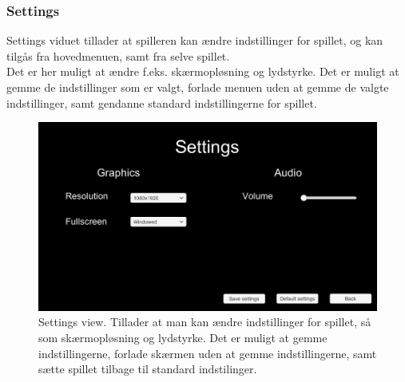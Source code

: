 \subsubsection{Settings}
Settings viduet tillader at spilleren kan ændre indstillinger for spillet, og kan tilgås fra hovedmenuen, samt fra selve spillet.\\
Det er her muligt at ændre f.eks. skærmopløsning og lydstyrke. Det er muligt at gemme de indstillinger som er valgt, forlade menuen uden at gemme de valgte indstillinger, samt gendanne standard indstillingerne for spillet. 

\begin{figure}[h]
\centering
\includegraphics[width = \textwidth]{02-Body/Images/settingsMockup.PNG}
\caption{Settings view. Tillader at man kan ændre indstillinger for spillet, så som skærmopløsning og lydstyrke. Det er muligt at gemme indstillingerne, forlade skærmen uden at gemme indstillingerne, samt sætte spillet tilbage til standard indstilinger.}
\label{fig:Design-FE-mockup-settings}
\end{figure}

\newpage
